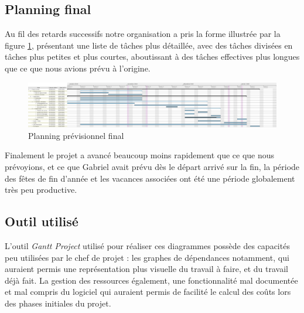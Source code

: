 \subsection{Planning final}

Au fil des retards successifs notre organisation a pris la
forme illustrée par la figure \ref{gantt5}, présentant une
liste de tâches plus détaillée, avec des tâches divisées en
tâches plus petites et plus courtes, aboutissant à des tâches
effectives plus longues que ce que nous avions prévu à
l'origine.

\begin{figure}[h]
  \caption{\label{gantt5} Planning prévisionnel final}
  \includegraphics[width=15cm]{images/gantt05}
\end{figure}

Finalement le projet a avancé beaucoup moins rapidement que
ce que nous prévoyions, et ce que Gabriel avait prévu dès le
départ arrivé sur la fin, la période des fêtes de fin d'année
et les vacances associées ont été une période globalement très
peu productive.

\subsection{Outil utilisé}

L'outil \textit{Gantt Project} utilisé pour réaliser ces
diagrammes possède des capacités peu utilisées par le chef
de projet : les graphes de dépendances notamment, qui auraient
permis une représentation plus visuelle du travail à faire,
et du travail déjà fait. La gestion des ressources également,
une fonctionnalité mal documentée et mal compris du logiciel
qui auraient permis de facilité le calcul des coûts lors des
phases initiales du projet.
